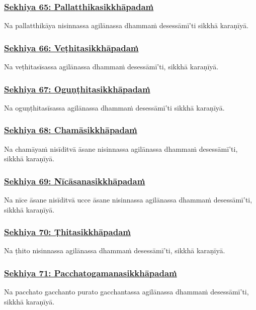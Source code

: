 \subsubsection*{\hyperref[training65]{Sekhiya 65: Pallatthikasikkhāpadaṁ}}
\label{sekh65}
Na pallatthikāya nisinnassa agilānassa dhammaṁ desessāmī'ti sikkhā karaṇīyā.

\subsubsection*{\hyperref[training66]{Sekhiya 66: Veṭhitasikkhāpadaṁ}}
\label{sekh66}
Na veṭhitasīsassa agilānassa dhammaṁ desessāmī'ti, sikkhā karaṇīyā.

\subsubsection*{\hyperref[training67]{Sekhiya 67: Oguṇṭhitasikkhāpadaṁ}}
\label{sekh67}
Na oguṇṭhitasīsassa agilānassa dhammaṁ desessāmī'ti sikkhā karaṇīyā.

\subsubsection*{\hyperref[training68]{Sekhiya 68: Chamāsikkhāpadaṁ}}
\label{sekh68}
Na chamāyaṁ nisīditvā āsane nisinnassa agilānassa dhammaṁ desessāmī'ti, sikkhā karaṇīyā.

\subsubsection*{\hyperref[training69]{Sekhiya 69: Nīcāsanasikkhāpadaṁ}}
\label{sekh69}
Na nīce āsane nisīditvā ucce āsane nisinnassa agilānassa dhammaṁ desessāmī'ti, sikkhā karaṇīyā.

\subsubsection*{\hyperref[training70]{Sekhiya 70: Ṭhitasikkhāpadaṁ}}
\label{sekh70}
Na ṭhito nisinnassa agilānassa dhammaṁ desessāmī'ti, sikkhā karaṇīyā.

\subsubsection*{\hyperref[training71]{Sekhiya 71: Pacchatogamanasikkhāpadaṁ}}
\label{sekh71}
Na pacchato gacchanto purato gacchantassa agilānassa dhammaṁ desessāmī'ti, sikkhā karaṇīyā.

